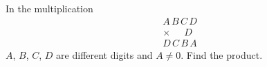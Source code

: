 In the multiplication
\[
\begin{array}{r}
A\,B\,C\,D\\
\times\quad\ \ D\\
\hline
D\,C\,B\,A
\end{array}
\]
$A$, $B$, $C$, $D$ are different digits and $A\ne0$. Find the product.
